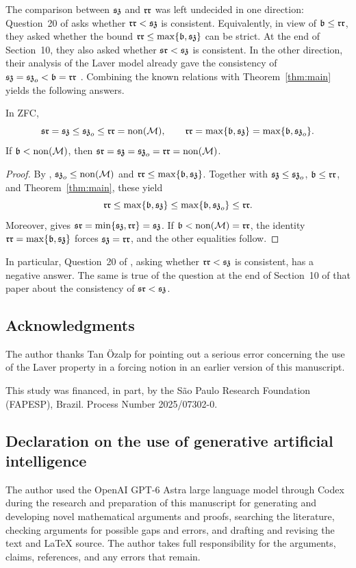 The comparison between $\mathfrak{sz}$ and $\mathfrak{rr}$ was left undecided in one
direction: Question~20 of \cite{BrendleBrianHamkins} asks whether
$\mathfrak{rr}<\mathfrak{sz}$ is consistent. Equivalently, in view of $\mathfrak b\leq\mathfrak{rr}$,
they asked whether the bound $\mathfrak{rr}\leq\max\{\mathfrak b,\mathfrak{sz}\}$ can be strict.
At the end of Section~10, they also asked whether $\mathfrak{sr}<\mathfrak{sz}$ is
consistent. In the other direction, their analysis of the Laver model
already gave the consistency of $\mathfrak{sz}=\mathfrak{sz}_o<\mathfrak b=\mathfrak{rr}$
\cite[Section~9]{BrendleBrianHamkins}.
Combining the known relations with Theorem~\ref{thm:main} yields the
following answers.

\begin{corollary}\label{cor:subseries}
In ZFC,
\[
 \mathfrak{sr}=\mathfrak{sz}\leq\mathfrak{sz}_o\leq\mathfrak{rr}=\operatorname{non}(\mathcal M),
 \qquad
 \mathfrak{rr}=\max\{\mathfrak b,\mathfrak{sz}\}=\max\{\mathfrak b,\mathfrak{sz}_o\}.
\]
If $\mathfrak b<\operatorname{non}(\mathcal M)$, then $\mathfrak{sr}=\mathfrak{sz}=\mathfrak{sz}_o=\mathfrak{rr}=\operatorname{non}(\mathcal M)$.
\end{corollary}

\begin{proof}
By \cite[Theorems~13 and~19(1)]{BrendleBrianHamkins},
$\mathfrak{sz}_o\leq\operatorname{non}(\mathcal M)$ and $\mathfrak{rr}\leq\max\{\mathfrak b,\mathfrak{sz}\}$.
Together with $\mathfrak{sz}\leq\mathfrak{sz}_o$, $\mathfrak b\leq\mathfrak{rr}$, and
Theorem~\ref{thm:main}, these yield
\[
 \mathfrak{rr}\leq\max\{\mathfrak b,\mathfrak{sz}\}\leq\max\{\mathfrak b,\mathfrak{sz}_o\}\leq\mathfrak{rr}.
\]
Moreover, \cite[Theorem~35]{BrendleBrianHamkins} gives
$\mathfrak{sr}=\min\{\mathfrak{sz},\mathfrak{rr}\}=\mathfrak{sz}$.
If $\mathfrak b<\operatorname{non}(\mathcal M)=\mathfrak{rr}$, the identity $\mathfrak{rr}=\max\{\mathfrak b,\mathfrak{sz}\}$ forces
$\mathfrak{sz}=\mathfrak{rr}$, and the other equalities follow.
\end{proof}

In particular, Question~20 of \cite{BrendleBrianHamkins}, asking
whether $\mathfrak{rr}<\mathfrak{sz}$ is consistent, has a negative answer. The same is
true of the question at the end of Section~10 of that paper about
the consistency of $\mathfrak{sr}<\mathfrak{sz}$.

\subsection*{Acknowledgments}

The author thanks Tan Özalp for pointing out a serious error concerning the use of
the Laver property in a forcing notion in an earlier version of this manuscript.

This study was financed, in part, by the São Paulo Research Foundation
(FAPESP), Brazil. Process Number 2025/07302-0.

\subsection*{Declaration on the use of generative artificial intelligence}

The author used the OpenAI GPT-6 Astra large language model through Codex during the
research and preparation of this manuscript for generating and
developing novel mathematical arguments and proofs, searching the literature,
checking arguments for possible gaps and errors, and drafting and
revising the text and \LaTeX{} source. The author
takes full responsibility for the arguments, claims, references, and
any errors that remain.
